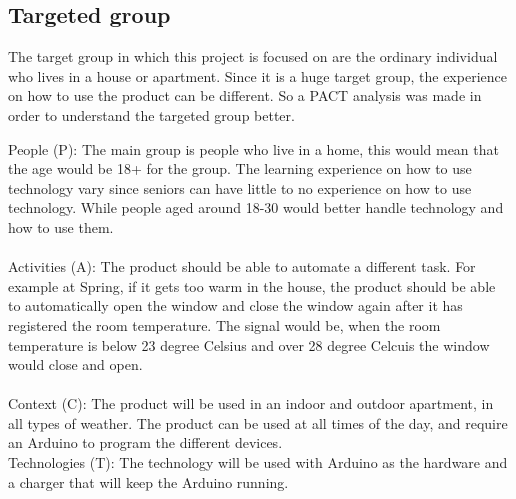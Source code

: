 \subsection{Targeted group}
\label{targetedGroup}
The target group in which this project is focused on are the ordinary individual who lives in a house or apartment. Since it is a huge target group, the experience on how to use the product can be different. So a PACT analysis was made in order to understand the targeted group better.

People (P): The main group is people who live in a home, this would mean that the age would be 18+ for the group. The learning experience on how to use technology vary since seniors can have little to no experience on how to use technology. While people aged around 18-30 would better handle technology and how to use them. \\
\\
Activities (A): The product should be able to automate a different task. For example at Spring, if it gets too warm in the house, the product should be able to automatically open the window and close the window again after it has registered the room temperature. The signal would be, when the room temperature is below 23 degree Celsius and over 28 degree Celcuis the window would close and open. \\
\\
Context (C): The product will be used in an indoor and outdoor apartment, in all types of weather. The product can be used at all times of the day, and require an Arduino to program the different devices.
\\
Technologies (T): The technology will be used with Arduino as the hardware and a charger that will keep the Arduino running. %
